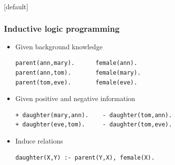 \documentclass{beamer}             %
\makeatletter
\newenvironment{withoutheadline}{
        \setbeamertemplate{headline}[default]
        \def\beamer@entrycode{\vspace*{-\headheight}}
    }{}
\makeatother
\begin{document}
\begin{withoutheadline}
\begin{frame}[fragile]

\frametitle{Inductive logic programming}

\begin{itemize}
 
\vfill
\pause
\item Given background knowledge

\begin{center}
\begin{minipage}{8.5cm}
\begin{block}{}
\begin{lstlisting}[basicstyle=\scriptsize]
parent(ann,mary).      female(ann).
parent(ann,tom).       female(mary).
parent(tom,eve).       female(eve).
\end{lstlisting}
\end{block}
\end{minipage}
\end{center}

\vfill
\pause
\item Given positive and negative information

\begin{center}
\begin{minipage}{8.5cm}
\begin{block}{}
\begin{lstlisting}[basicstyle=\scriptsize]
+ daughter(mary,ann).    - daughter(tom,ann).
+ daughter(eve,tom).     - daughter(tom,eve).
\end{lstlisting}
\end{block}
\end{minipage}
\end{center}

\vfill
\pause
\item Induce relations
\begin{center}
\begin{minipage}{8.5cm}
\begin{block}{}
\begin{lstlisting}[basicstyle=\scriptsize]
daughter(X,Y) :- parent(Y,X), female(X).
\end{lstlisting}
\end{block}
\end{minipage}
\end{center}

\vfill
\end{itemize}

\end{frame}
\end{withoutheadline}
\end{document}
